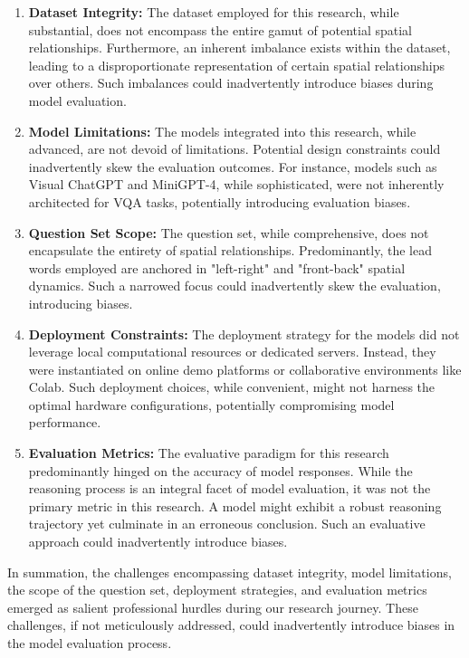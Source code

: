 \documentclass[twocolumn,11pt]{report}
\begin{document}
\begin{enumerate}
\item \textbf{Dataset Integrity:} The dataset employed for this research, while substantial, does not encompass the entire gamut of potential spatial relationships. Furthermore, an inherent imbalance exists within the dataset, leading to a disproportionate representation of certain spatial relationships over others. Such imbalances could inadvertently introduce biases during model evaluation.

\item \textbf{Model Limitations:} The models integrated into this research, while advanced, are not devoid of limitations. Potential design constraints could inadvertently skew the evaluation outcomes. For instance, models such as Visual ChatGPT and MiniGPT-4, while sophisticated, were not inherently architected for VQA tasks, potentially introducing evaluation biases.

\item \textbf{Question Set Scope:} The question set, while comprehensive, does not encapsulate the entirety of spatial relationships. Predominantly, the lead words employed are anchored in "left-right" and "front-back" spatial dynamics. Such a narrowed focus could inadvertently skew the evaluation, introducing biases.

\item \textbf{Deployment Constraints:} The deployment strategy for the models did not leverage local computational resources or dedicated servers. Instead, they were instantiated on online demo platforms or collaborative environments like Colab. Such deployment choices, while convenient, might not harness the optimal hardware configurations, potentially compromising model performance.

\item \textbf{Evaluation Metrics:} The evaluative paradigm for this research predominantly hinged on the accuracy of model responses. While the reasoning process is an integral facet of model evaluation, it was not the primary metric in this research. A model might exhibit a robust reasoning trajectory yet culminate in an erroneous conclusion. Such an evaluative approach could inadvertently introduce biases.

\end{enumerate}

In summation, the challenges encompassing dataset integrity, model limitations, the scope of the question set, deployment strategies, and evaluation metrics emerged as salient professional hurdles during our research journey. These challenges, if not meticulously addressed, could inadvertently introduce biases in the model evaluation process.
\end{document}
